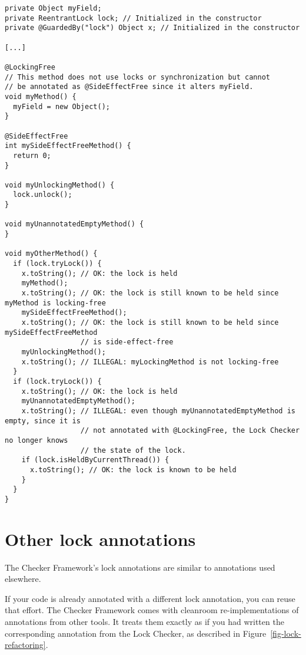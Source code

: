 \begin{verbatim}
private Object myField;
private ReentrantLock lock; // Initialized in the constructor
private @GuardedBy("lock") Object x; // Initialized in the constructor

[...]

@LockingFree
// This method does not use locks or synchronization but cannot
// be annotated as @SideEffectFree since it alters myField.
void myMethod() {
  myField = new Object();
}

@SideEffectFree
int mySideEffectFreeMethod() {
  return 0;
}

void myUnlockingMethod() {
  lock.unlock();
}

void myUnannotatedEmptyMethod() {
}

void myOtherMethod() {
  if (lock.tryLock()) {
    x.toString(); // OK: the lock is held
    myMethod();
    x.toString(); // OK: the lock is still known to be held since myMethod is locking-free
    mySideEffectFreeMethod();
    x.toString(); // OK: the lock is still known to be held since mySideEffectFreeMethod
                  // is side-effect-free
    myUnlockingMethod();
    x.toString(); // ILLEGAL: myLockingMethod is not locking-free
  }
  if (lock.tryLock()) {
    x.toString(); // OK: the lock is held
    myUnannotatedEmptyMethod();
    x.toString(); // ILLEGAL: even though myUnannotatedEmptyMethod is empty, since it is
                  // not annotated with @LockingFree, the Lock Checker no longer knows
                  // the state of the lock.
    if (lock.isHeldByCurrentThread()) {
      x.toString(); // OK: the lock is known to be held
    }
  }
}
\end{verbatim}

\section{Other lock annotations\label{other-lock-annotations}}

The Checker Framework's lock annotations are similar to annotations used
elsewhere.

If your code is already annotated with a different lock
annotation, you can reuse that effort.  The Checker Framework comes with
cleanroom re-implementations of annotations from other tools.  It treats
them exactly as if you had written the corresponding annotation from the
Lock Checker, as described in Figure~\ref{fig-lock-refactoring}.


